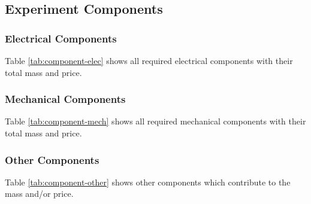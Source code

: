 \begin{landscape}
\subsection{Experiment Components} \label{components}
\label{sec:experiment-components}

\subsubsection{Electrical Components}
Table \ref{tab:component-elec} shows all required electrical components with their total mass and price.\\


    \end{landscape}

\begin{landscape}

\subsubsection{Mechanical Components}
Table \ref{tab:component-mech} shows all required mechanical components with their total mass and price.\\


\raggedbottom
\end{landscape}

\begin{landscape}
\subsubsection{Other Components}
Table \ref{tab:component-other} shows other components which contribute to the mass and/or price.\\



\raggedbottom
\end{landscape}
